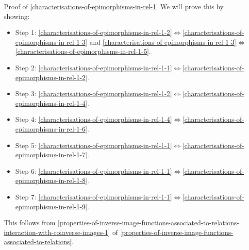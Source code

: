 \begin{Proof}{Proof of \cref{characterisations-of-epimorphisms-in-rel-1}}%
    We will prove this by showing:
    \begin{itemize}
        \item Step 1: \cref{characterisations-of-epimorphisms-in-rel-1-2}$\iff$\cref{characterisations-of-epimorphisms-in-rel-1-3} and \cref{characterisations-of-epimorphisms-in-rel-1-3}$\iff$\cref{characterisations-of-epimorphisms-in-rel-1-5}.
        \item Step 2: \cref{characterisations-of-epimorphisms-in-rel-1-1}$\iff$\cref{characterisations-of-epimorphisms-in-rel-1-2}.
        \item Step 3: \cref{characterisations-of-epimorphisms-in-rel-1-2}$\iff$\cref{characterisations-of-epimorphisms-in-rel-1-4}.
        \item Step 4: \cref{characterisations-of-epimorphisms-in-rel-1-4}$\iff$\cref{characterisations-of-epimorphisms-in-rel-1-6}.
        \item Step 5: \cref{characterisations-of-epimorphisms-in-rel-1-1}$\iff$\cref{characterisations-of-epimorphisms-in-rel-1-7}.
        \item Step 6: \cref{characterisations-of-epimorphisms-in-rel-1-1}$\iff$\cref{characterisations-of-epimorphisms-in-rel-1-8}.
        \item Step 7: \cref{characterisations-of-epimorphisms-in-rel-1-1}$\iff$\cref{characterisations-of-epimorphisms-in-rel-1-9}.
    \end{itemize}

    This follows from \cref{properties-of-inverse-image-functions-associated-to-relations-interaction-with-coinverse-images-1} of \cref{properties-of-inverse-image-functions-associated-to-relations}.


\end{Proof}
